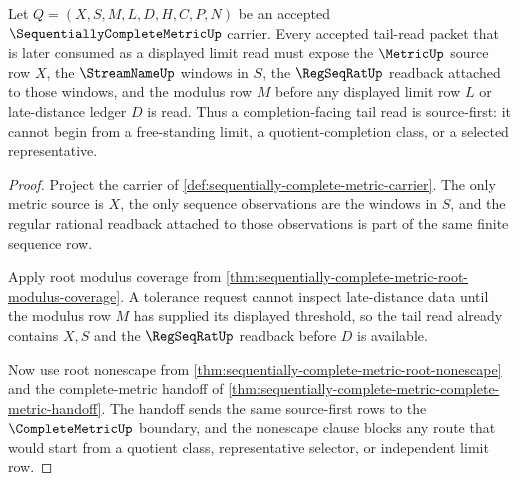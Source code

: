 \begin{theorem}
\label{thm:sequentially-complete-metric-source-first-tail-read}
Let $Q=(X,S,M,L,D,H,C,P,N)$ be an accepted $\SequentiallyCompleteMetricUp$ carrier. Every accepted tail-read packet that is later consumed as a displayed limit read must expose the $\MetricUp$ source row $X$, the $\StreamNameUp$ windows in $S$, the $\RegSeqRatUp$ readback attached to those windows, and the modulus row $M$ before any displayed limit row $L$ or late-distance ledger $D$ is read. Thus a completion-facing tail read is source-first: it cannot begin from a free-standing limit, a quotient-completion class, or a selected representative.
\end{theorem}
\begin{proof}
Project the carrier of \autoref{def:sequentially-complete-metric-carrier}. The only metric source is $X$, the only sequence observations are the windows in $S$, and the regular rational readback attached to those observations is part of the same finite sequence row.

Apply root modulus coverage from \autoref{thm:sequentially-complete-metric-root-modulus-coverage}. A tolerance request cannot inspect late-distance data until the modulus row $M$ has supplied its displayed threshold, so the tail read already contains $X,S$ and the $\RegSeqRatUp$ readback before $D$ is available.

Now use root nonescape from \autoref{thm:sequentially-complete-metric-root-nonescape} and the complete-metric handoff of \autoref{thm:sequentially-complete-metric-complete-metric-handoff}. The handoff sends the same source-first rows to the $\CompleteMetricUp$ boundary, and the nonescape clause blocks any route that would start from a quotient class, representative selector, or independent limit row.
\end{proof}

